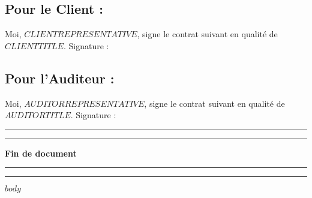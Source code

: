 \documentclass[12pt]{extarticle}
\begin{document}
\subsection{Pour le Client :}
Moi, \textit{$CLIENTREPRESENTATIVE$}, signe le contrat suivant en qualité de \textit{$CLIENTTITLE$}.
\vspace{3cm}
Signature :
\subsection{Pour l'Auditeur :}
Moi, \textit{$AUDITORREPRESENTATIVE$}, signe le contrat suivant en qualité de \textit{$AUDITORTITLE$}.
\vspace{3cm}
Signature :
\noindent\rule{\textwidth}{0.4pt}
\vspace{1cm}
\noindent\rule{\textwidth}{0.4pt}
\begin{center}
    \Huge\textbf{Fin de document}
\end{center}
\vspace{1cm}
\noindent\rule{\textwidth}{0.4pt}
\vspace{1cm}
\noindent\rule{\textwidth}{0.4pt}
$body$
\end{document}
